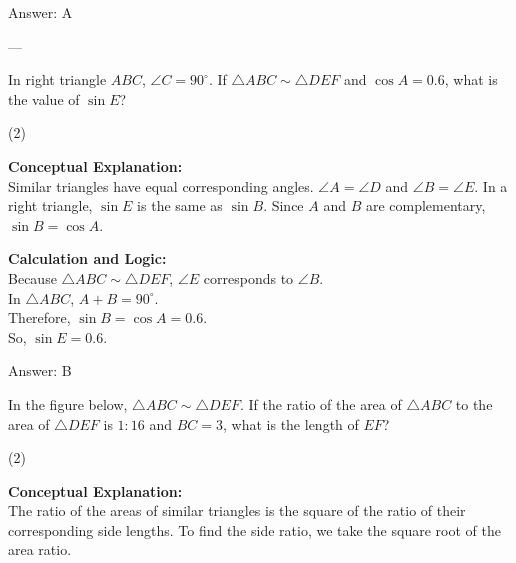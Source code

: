 \documentclass[11pt,paper=a4,answers]{exam}
\begin{document}
\begin{questions}
\begin{solution}
\vspace{15pt}
Answer: \colorbox{yellow!100}{A}
\end{solution}

---

\question
In right triangle $ABC$, $\angle C = 90^\circ$. If $\triangle ABC \sim \triangle DEF$ and $\cos A = 0.6$, what is the value of $\sin E$?
\begin{tasks}(2)
\end{tasks}

\begin{solution}
\textbf{Conceptual Explanation:} \\
Similar triangles have equal corresponding angles. $\angle A = \angle D$ and $\angle B = \angle E$. In a right triangle, $\sin E$ is the same as $\sin B$. Since $A$ and $B$ are complementary, $\sin B = \cos A$.

\vspace{10pt}
\textbf{Calculation and Logic:} \\
Because $\triangle ABC \sim \triangle DEF$, $\angle E$ corresponds to $\angle B$. \\
In $\triangle ABC$, $A + B = 90^\circ$. \\
Therefore, $\sin B = \cos A = 0.6$. \\
So, $\sin E = 0.6$.

\vspace{15pt}
Answer: \colorbox{yellow!100}{B}
\end{solution}


\question
In the figure below, $\triangle ABC \sim \triangle DEF$. If the ratio of the area of $\triangle ABC$ to the area of $\triangle DEF$ is $1:16$ and $BC = 3$, what is the length of $EF$?
\begin{tasks}(2)
\end{tasks}

\begin{solution}
\textbf{Conceptual Explanation:} \\
The ratio of the areas of similar triangles is the square of the ratio of their corresponding side lengths. To find the side ratio, we take the square root of the area ratio.


\end{solution}
\end{questions}
\end{document}
